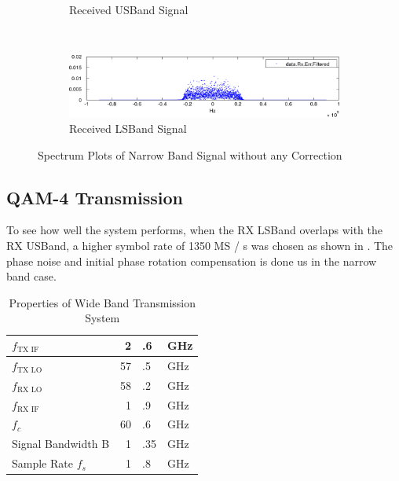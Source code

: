 \begin{figure}[p]
\begin{subfigure}{\textwidth}
    \caption{Received \gls{USBand} Signal}
    \label{fig:res_450_freq_uncorr_rx_usb}
  \end{subfigure}
  \vspace{4ex} \\
  \begin{subfigure}{\textwidth}
    \centering
    \includegraphics[width=\textwidth]{figures/matlab/res_450_freq_uncorr_rx_lsb}
    \caption{Received \gls{LSBand} Signal}
    \label{fig:res_450_freq_uncorr_rx_lsb}
  \end{subfigure}
  \caption{Spectrum Plots of Narrow Band Signal without any Correction}
  \label{fig:res_450_freq_uncorr}
\end{figure}

\subsection{\gls{QAM}-4 Transmission}
To see how well the system performs, when the \gls{RX} \gls{LSBand} overlaps
with the \gls{RX} \gls{USBand}, a higher symbol rate of 1350 MS / s was chosen
as shown in . The phase noise and initial phase
rotation compensation is done us in the narrow band case. \\

\begin{table}[h]
  \centering
  \begin{tabular}{|l|r@{}l@{~}l|}
    \hline
    $f_{\text{TX IF}}$ & 2&.6&GHz \\ \hline
    $f_{\text{TX LO}}$ & 57&.5&GHz \\ \hline
    $f_{\text{RX LO}}$ & 58&.2&GHz \\ \hline
    $f_{\text{RX IF}}$ & 1&.9&GHz \\ \hline
    $f_c$            & 60&.6&GHz \\ \hline
    Signal Bandwidth B & 1&.35&GHz \\ \hline
    Sample Rate $f_s$ & 1&.8&GHz \\ \hline
  \end{tabular}
  \caption{Properties of Wide Band Transmission System}
  \label{tab:res_1350_freq}
\end{table}

